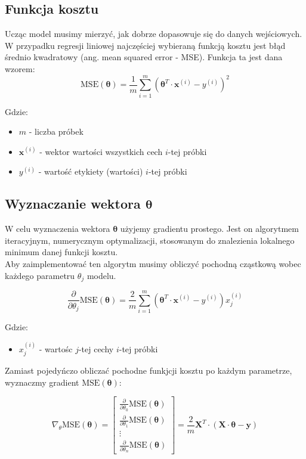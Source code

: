 \documentclass{article}
\begin{document}
\subsection{Funkcja kosztu}
Ucząc model musimy mierzyć, jak dobrze dopasowuje się do danych wejściowych. W przypadku regresji liniowej najczęściej wybieraną funkcją kosztu jest błąd średnio kwadratowy (ang. mean squared error - MSE). Funkcja ta jest dana wzorem: 
\begin{equation}
    \text{MSE}(\bm{\theta}) = \frac{1}{m}\sum_{i = 1}^{m}(\bm{\theta}^T\cdot\bm{x}^{(i)} - y^{(i)})^2
\end{equation}

\noindent Gdzie:
\begin{itemize}
    \item $m$ - liczba próbek
    \item $\bm{x}^{(i)}$ - wektor wartości wszystkich cech $i$-tej próbki
    \item $y^{(i)}$ - wartość etykiety (wartości) $i$-tej próbki 
\end{itemize}

\subsection{Wyznaczanie wektora $\bm{\theta}$}
W celu wyznaczenia wektora $\bm{\theta}$ użyjemy gradientu prostego. Jest on algorytmem iteracyjnym, numerycznym optymalizacji, stosowanym do znalezienia lokalnego minimum danej funkcji kosztu.\\

\noindent Aby zaimplementować ten algorytm musimy obliczyć pochodną cząstkową wobec każdego parametru $\theta_j$ modelu.

\begin{equation}
    \frac{\partial}{\partial \theta_j}\text{MSE}(\bm{\theta})=\frac{2}{m}\sum_{i = 1}^{m} (\bm{\theta}^T\cdot\bm{x}^{(i)} -y^{(i)})x^{(i)}_{j}
\end{equation}

\noindent Gdzie:
\begin{itemize}
    \item $x_j^{(i)}$ - wartośc $j$-tej cechy $i$-tej próbki
\end{itemize}

\noindent Zamiast pojedyńczo obliczać pochodne funkjcji kosztu po każdym parametrze, wyznaczmy gradient $\text{MSE}(\bm{\theta})$:

\begin{equation}
    \nabla_{\theta}\text{MSE}(\bm{\theta})=\begin{bmatrix}
    \frac{\partial}{\partial \theta_0}\text{MSE}(\bm{\theta}) \\
    \frac{\partial}{\partial \theta_1}\text{MSE}(\bm{\theta}) \\
    \vdots \\
    \frac{\partial}{\partial \theta_n}\text{MSE}(\bm{\theta})
    \end{bmatrix} = \frac{2}{m}\bm{X}^T\cdot (\bm{X} \cdot \bm{\theta} - \bm{y})
\end{equation}
\end{document}
